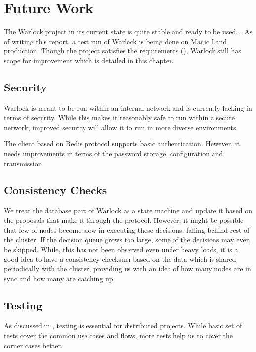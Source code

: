 \chapter{Future Work}
\label{chapter:future.work}

The Warlock project in its current state is quite stable and ready to be used.%
. As of writing this report, a test run of Warlock is being done on Magic Land
production. Though the project satisfies the requirements
 (), Warlock still has scope for improvement which is
 detailed in this chapter.

\section{Security}

Warlock is meant to be run within an internal network and is currently lacking
in terms of security. While this makes it reasonably safe to run within a secure
network, improved security will allow it to run in more diverse environments.

The client based on Redis protocol supports basic authentication. However, it
needs improvements in terms of the password storage, configuration and
transmission.

\section{Consistency Checks}

We treat the database part of Warlock as a state machine and update it based
on the proposals that make it through the protocol. However, it
might be possible that few of nodes become slow in executing
these decisions, falling behind
rest of the cluster. If the decision queue grows too large, some of the
decisions may even be skipped. While, this has not been observed even under
heavy loads, it is a good idea to have a consistency checksum based on the data
which is shared periodically with the cluster, providing us with an idea of
how many nodes are in sync and how many are catching up.

\section{Testing}

As discussed in , testing is essential for distributed
projects. While basic set of tests cover the common use cases and flows, more
tests help us to cover the corner cases better.

